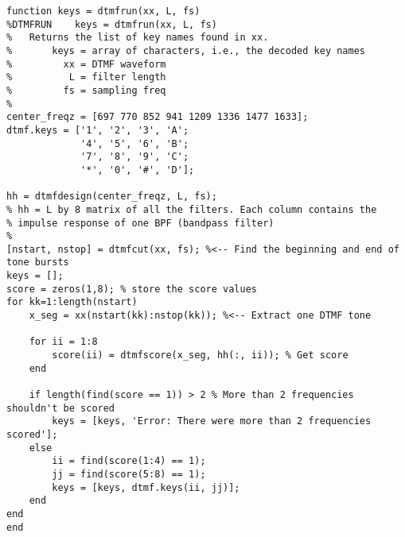 \begin{lstlisting}[Language=Matlab]
function keys = dtmfrun(xx, L, fs)
%DTMFRUN    keys = dtmfrun(xx, L, fs)
%   Returns the list of key names found in xx.
%       keys = array of characters, i.e., the decoded key names
%         xx = DTMF waveform
%          L = filter length
%         fs = sampling freq
%
center_freqz = [697 770 852 941 1209 1336 1477 1633];
dtmf.keys = ['1', '2', '3', 'A';
             '4', '5', '6', 'B';
             '7', '8', '9', 'C';
             '*', '0', '#', 'D'];

hh = dtmfdesign(center_freqz, L, fs);
% hh = L by 8 matrix of all the filters. Each column contains the
% impulse response of one BPF (bandpass filter)
%
[nstart, nstop] = dtmfcut(xx, fs); %<-- Find the beginning and end of tone bursts
keys = [];
score = zeros(1,8); % store the score values
for kk=1:length(nstart)
    x_seg = xx(nstart(kk):nstop(kk)); %<-- Extract one DTMF tone

    for ii = 1:8
        score(ii) = dtmfscore(x_seg, hh(:, ii)); % Get score
    end

    if length(find(score == 1)) > 2 % More than 2 frequencies shouldn't be scored
        keys = [keys, 'Error: There were more than 2 frequencies scored'];
    else
        ii = find(score(1:4) == 1);
        jj = find(score(5:8) == 1);
        keys = [keys, dtmf.keys(ii, jj)];
    end
end
end
\end{lstlisting}